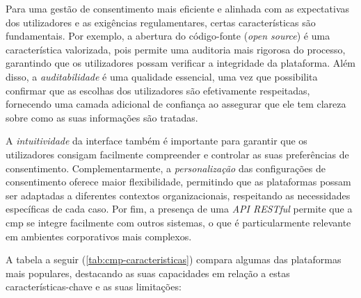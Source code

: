 Para uma gestão de consentimento mais eficiente e alinhada com as expectativas dos utilizadores e as exigências regulamentares, certas características são fundamentais. Por exemplo, a abertura do código-fonte (\textit{open source}) é uma característica valorizada, pois permite uma auditoria mais rigorosa do processo, garantindo que os utilizadores possam verificar a integridade da plataforma. Além disso, a \textit{auditabilidade} é uma qualidade essencial, uma vez que possibilita confirmar que as escolhas dos utilizadores são efetivamente respeitadas, fornecendo uma camada adicional de confiança ao assegurar que ele tem clareza sobre como as suas informações são tratadas.

A \textit{intuitividade} da interface também é importante para garantir que os utilizadores consigam facilmente compreender e controlar as suas preferências de consentimento. Complementarmente, a \textit{personalização} das configurações de consentimento oferece maior flexibilidade, permitindo que as plataformas possam ser adaptadas a diferentes contextos organizacionais, respeitando as necessidades específicas de cada caso. Por fim, a presença de uma \textit{API RESTful} permite que a \acrshort{cmp} se integre facilmente com outros sistemas, o que é particularmente relevante em ambientes corporativos mais complexos.

A tabela a seguir (\ref{tab:cmp-caracteristicas}) compara algumas das plataformas mais populares, destacando as suas capacidades em relação a estas características-chave e as suas limitações:

\begin{table}[H]
\centering
\caption{Comparação das principais características das \acrshort{cmp}s existentes}
\label{tab:cmp-caracteristicas}
\end{table}


